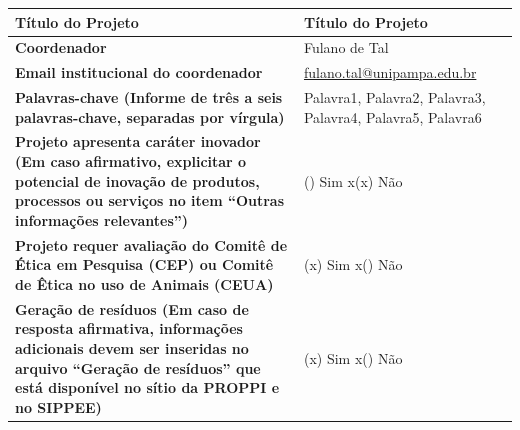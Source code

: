 \documentclass[
  12pt,				
  openright,	
  twoside,	
  a4paper,
  brazil,	
  oldfontcommands,
  ]{abntex2}
\newcommand{\xmark}{\ding{55}}%
\newcommand{\whitespace}{{\color{white}x}}%
\begin{document}
\pagestyle{fancy}

\fancyhf{}
\fancyfoot[RE,RO]{\thepage\xspace de \pageref{DocLastPage}}

\begin{table}[htp]
\begin{center}
\begin{tabularx}{\textwidth}{|p{7.5cm}|X|}
\hline
\cellcolor{green} \textbf{T\'{i}tulo do Projeto} 
& Título do Projeto \\\hline

\cellcolor{green} \textbf{Coordenador} 
& Fulano de Tal \\\hline

\cellcolor{green} \textbf{Email institucional do coordenador} 
& \href{mailto:fulano.tal@unipampa.edu.br}{fulano.tal@unipampa.edu.br} \\\hline

\cellcolor{green} \textbf{Palavras-chave {\tiny (Informe de tr\^{e}s a seis palavras-chave, separadas por v\'{i}rgula)}} 
& Palavra1, Palavra2, Palavra3, Palavra4, Palavra5, Palavra6 \\\hline

\cellcolor{green} \textbf{Projeto apresenta car\'{a}ter inovador {\tiny (Em caso afirmativo, explicitar o potencial de inova\c{c}\~{a}o de produtos, processos ou servi\c{c}os no item ``Outras informa\c{c}\~{o}es relevantes'')}} 
& (\xmark) Sim \whitespace (\whitespace) N\~{a}o \\\hline

\cellcolor{green} \textbf{Projeto requer avalia\c{c}\~{a}o do Comit\^{e} de \'{E}tica em Pesquisa (CEP) ou Comit\^{e} de \^{E}tica no uso de Animais (CEUA)} 
& (\whitespace) Sim \whitespace (\xmark) N\~{a}o \\\hline

\cellcolor{green} \textbf{Gera\c{c}\~{a}o de res\'{i}duos {\tiny (Em caso de resposta afirmativa, informa\c{c}\~{o}es adicionais devem ser inseridas no arquivo ``Gera\c{c}\~{a}o de res\'{i}duos'' que est\'{a} dispon\'{i}vel no s\'{i}tio da PROPPI e no SIPPEE)}} 
& (\whitespace) Sim \whitespace (\xmark) N\~{a}o \\\hline
\end{tabularx}
\end{center}
\end{table}
\vspace{-10mm}
\end{document}
